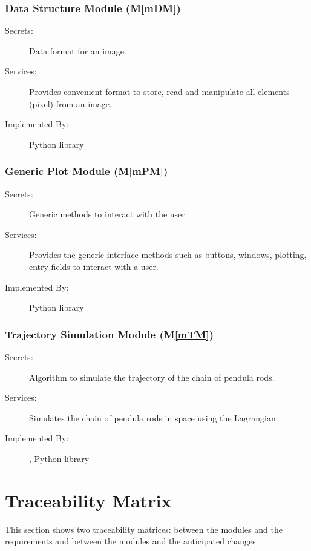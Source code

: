 \documentclass[12pt, titlepage]{article}
\newcommand{\mref}[1]{M\ref{#1}}
\begin{document}
\subsubsection{Data Structure Module  (\mref{mDM})}
\label{MG_DataStruct}
\begin{description}
\item[Secrets:] Data format for an image.
\item[Services:] Provides convenient format to store, read and manipulate all 
elements (pixel) from an image.
\item[Implemented By:] Python library
\end{description}

\subsubsection{Generic Plot Module  (\mref{mPM})}
\label{MG_GUIGene}
\begin{description}
\item[Secrets:] Generic methods to interact with the user.
\item[Services:] Provides the generic interface methods such as buttons, 
windows, plotting, entry fields to interact with a user.
\item[Implemented By:] Python library
\end{description}

\subsubsection{Trajectory Simulation Module (\mref{mTM})}
\label{MG_SMHSim}
\begin{description}
\item[Secrets:] Algorithm to simulate the trajectory of the chain 
of pendula rods.
\item[Services:] Simulates the chain of pendula rods in space using the
Lagrangian.
\item[Implemented By:] \progname , Python library
\end{description}

\section{Traceability Matrix} \label{SecTM}

This section shows two traceability matrices: between the modules and the
requirements and between the modules and the anticipated changes.
\end{document}

